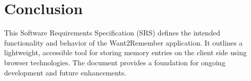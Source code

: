\documentclass[12pt]{article}
\begin{document}
\section{Conclusion}
This Software Requirements Specification (SRS) defines the intended functionality and behavior of the Want2Remember application. It outlines a lightweight, accessible tool for storing memory entries on the client side using browser technologies. The document provides a foundation for ongoing development and future enhancements.
\end{document}
